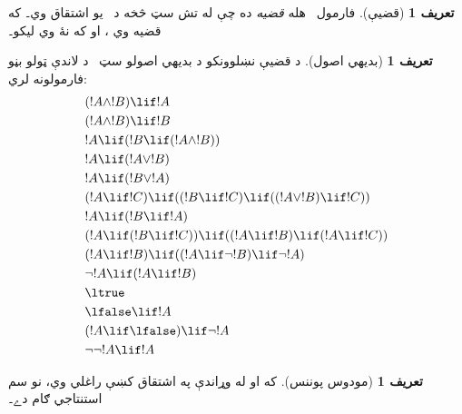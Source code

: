 \documentclass[12pt,a4paper,oneside]{report}
\newcommand{\olfileid}[3]{\gdef\pspart{#1}\gdef\pschapter{#2}\gdef\pssection{#3}}
\gdef\pspart{#2}\gdef\pschapter{#3}\gdef\pssection{}%
\newcommand{\ollabel}[1]{\label{\pspart:\pschapter:\pssection:#1}}
\theoremstyle{definition}
\newtheorem{defn}[thm]{تعريف}
\begin{document}
\label{olpseg:OLP-0113-B012:start}
\begin{defn}[قضيې]
فارمول~ هله \emph{قضيه} ده چې له تش سټ څخه د~ يو
اشتقاق وي۔ که  قضيه وي ، او که نۀ وي
 ليکو۔
\end{defn}
\label{olpseg:OLP-0113-B012:end}

\label{olpseg:OLP-0114-B004:start}
\olfileid{fol}{axd}{prp}
\label{olpseg:OLP-0114-B004:end}

\label{olpseg:OLP-0114-B005:start}
\label{olpseg:OLP-0114-B005:end}

\label{olpseg:OLP-0114-B006:start}
\begin{defn}[بديهي اصول]
د قضيې نښلوونکو د بديهي اصولو سټ~\LR{$\PAx$} د لاندې ټولو بڼو
فارمولونه لري:
\begin{align}
  & (!A \land !B) \lif !A \ollabel{ax:land1}\\
  & (!A \land !B) \lif !B \ollabel{ax:land2}\\
  & !A \lif (!B \lif (!A \land !B)) \ollabel{ax:land3}\\
  & !A \lif (!A \lor !B) \ollabel{ax:lor1}\\
  & !A \lif (!B \lor !A) \ollabel{ax:lor2}\\
  & (!A \lif !C) \lif ((!B \lif !C) \lif ((!A \lor !B) \lif !C)) \ollabel{ax:lor3}\\
  & !A \lif (!B \lif !A) \ollabel{ax:lif1}\\
  & (!A \lif (!B \lif !C)) \lif ((!A \lif !B) \lif (!A \lif !C)) \ollabel{ax:lif2}\\
  & (!A \lif !B) \lif ((!A \lif \lnot !B) \lif \lnot !A) \ollabel{ax:lnot1}\\
  & \lnot !A \lif (!A \lif !B) \ollabel{ax:lnot2}\\
  & \ltrue \ollabel{ax:ltrue}\\
  & \lfalse \lif !A \ollabel{ax:lfalse1}\\
  & (!A \lif \lfalse) \lif \lnot !A \ollabel{ax:lfalse2}\\
  & \lnot\lnot !A \lif !A \ollabel{ax:dne}
\end{align}
\end{defn}
\label{olpseg:OLP-0114-B006:end}

\label{olpseg:OLP-0114-B007:start}
\begin{defn}[مودوس پوننس]
  که  او  له وړاندې په اشتقاق کښې راغلي
  وي، نو  سم استنتاجي ګام دے۔
\end{defn}
\label{olpseg:OLP-0114-B007:end}
\end{document}
